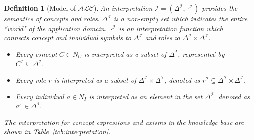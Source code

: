 \documentclass{article}
\newtheorem{mydef}{Definition}
\begin{document}
\begin{mydef}[Model of $\mathcal{ALC}$]
An interpretation $\mathcal{I}=(\Delta^\mathcal{I},\cdot^\mathcal{I})$ provides the semantics of concepts and roles. $\Delta^\mathcal{I}$ is a non-empty set which indicates the entire
``world" of the application domain. $\cdot^\mathcal{I}$ is an interpretation function which connects concept and individual symbols to $\Delta^\mathcal{I}$ and roles to $\Delta^\mathcal{I} \times \Delta^\mathcal{I}$.
\begin{itemize}
 \item Every concept $C\in N_C$ is interpreted as a subset of $\Delta^\mathcal{I}$, represented by $C^\mathcal{I}\subseteq \Delta^\mathcal{I}$.
 \item Every  role $r$ is interpreted as a subset of $\Delta^\mathcal{I}\times\Delta^\mathcal{I}$, denoted as $r^\mathcal{I}\subseteq \Delta^\mathcal{I}\times\Delta^\mathcal{I}$.
 \item Every individual $a \in N_I$ is interpreted as an element in the set $\Delta^\mathcal{I}$, denoted as $a^\mathcal{I} \in \Delta^\mathcal{I}$.
\end{itemize}
The interpretation for concept expressions and axioms in the knowledge base are shown in Table~\ref{tab:interpretation}.
\end{mydef}
\end{document}
